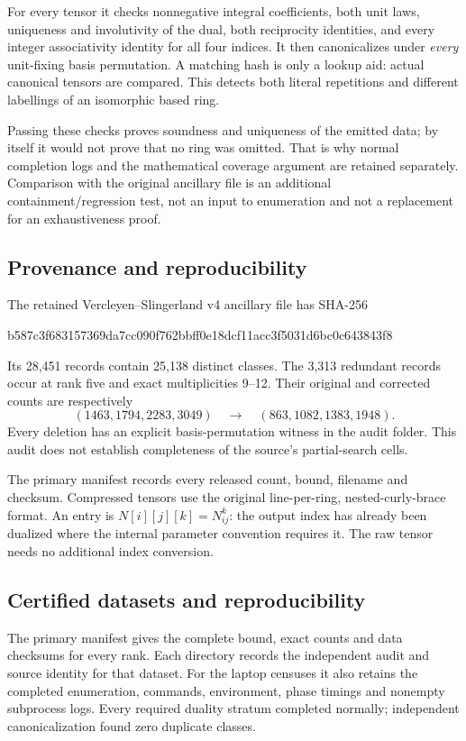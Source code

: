 \documentclass[11pt,a4paper]{article}
\theoremstyle{definition}\newtheorem{definition}[theorem]{Definition}\newtheorem{remark}[theorem]{Remark}
\begin{document}
For every tensor it checks nonnegative integral coefficients, both unit laws,
uniqueness and involutivity of the dual, both reciprocity identities, and every
integer associativity identity for all four indices. It then canonicalizes
under \emph{every} unit-fixing basis permutation. A matching hash is only a
lookup aid: actual canonical tensors are compared. This detects both literal
repetitions and different labellings of an isomorphic based ring.

Passing these checks proves soundness and uniqueness of the emitted data; by
itself it would not prove that no ring was omitted. That is why normal completion
logs and the mathematical coverage argument are retained separately. Comparison
with the original ancillary file is an additional containment/regression test,
not an input to enumeration and not a replacement for an exhaustiveness proof.

\subsection{Provenance and reproducibility}
The retained Vercleyen--Slingerland v4 ancillary file has SHA-256
\begin{center}\footnotesize\ttfamily
b587c3f683157369da7cc090f762bbff0e18dcf11acc3f5031d6bc0c643843f8
\end{center}
Its 28,451 records contain 25,138 distinct classes. The 3,313 redundant records
occur at rank five and exact multiplicities 9--12. Their original and corrected
counts are respectively
\[
(1463,1794,2283,3049)\quad\longrightarrow\quad(863,1082,1383,1948).
\]
Every deletion has an explicit basis-permutation witness in the audit folder.
This audit does not establish completeness of the source's partial-search cells.

The primary manifest  records every released count,
bound, filename and checksum. Compressed tensors use the original line-per-ring,
nested-curly-brace format. An entry is $N[i][j][k]=N_{ij}^{k}$: the output index
has already been dualized where the internal parameter convention requires it.
The raw tensor needs no additional index conversion.

\subsection{Certified datasets and reproducibility}
The primary manifest gives the complete bound, exact counts and data checksums
for every rank. Each  directory records the independent
audit and source identity for that dataset. For the laptop censuses it also
retains the completed enumeration, commands, environment, phase timings and
nonempty subprocess logs. Every required duality stratum completed normally;
independent canonicalization found zero duplicate classes.
\end{document}
